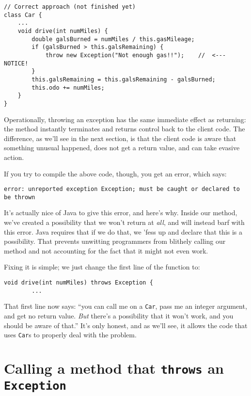 \begin{Verbatim}[samepage=true,fontsize=\small,frame=single]
// Correct approach (not finished yet)
class Car {
    ...
    void drive(int numMiles) {
        double galsBurned = numMiles / this.gasMileage;
        if (galsBurned > this.galsRemaining) {
            throw new Exception("Not enough gas!!");    //  <---  NOTICE!
        }
        this.galsRemaining = this.galsRemaining - galsBurned;
        this.odo += numMiles;
    }
}
\end{Verbatim}

Operationally, throwing an exception has the same immediate effect as
returning: the method instantly terminates and returns control back to the
client code. The difference, as we'll see in the next section, is that the
client code is aware that something unusual happened, does not get a return
value, and can take evasive action.

If you try to compile the above code, though, you get an error, which says:

\begin{Verbatim}[samepage=true,fontsize=\footnotesize]
  error: unreported exception Exception; must be caught or declared to be thrown
\end{Verbatim}

It's actually nice of Java to give this error, and here's why. Inside our
method, we've created a possibility that we won't return at \textit{all}, and
will instead barf with this error. Java requires that if we do that, we 'fess
up and declare that this is a possibility. That prevents unwitting programmers
from blithely calling our method and not accounting for the fact that it might
not even work.

Fixing it is simple; we just change the first line of the function to:

\begin{Verbatim}[samepage=true,fontsize=\footnotesize,frame=single]
    void drive(int numMiles) throws Exception {
        ...
\end{Verbatim}

That first line now says: ``you can call me on a \texttt{Car}, pass me an
integer argument, and get no return value. \textit{But} there's a possibility
that it won't work, and you should be aware of that.'' It's only honest, and
as we'll see, it allows the code that uses \texttt{Car}s to properly deal with
the problem.


\section{Calling a method that \texttt{throws} an \texttt{Exception}}

